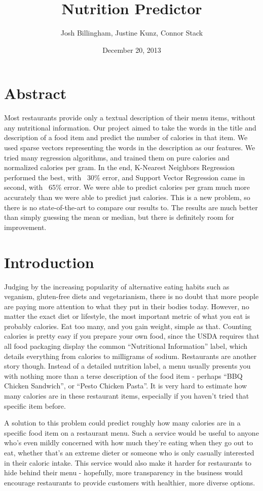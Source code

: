 \documentclass{article}
\title{Nutrition Predictor}
\author{Josh Billingham, Justine Kunz, Connor Stack}
\date{December 20, 2013}
\begin{document}
\maketitle

\section{Abstract}

Most restaurants provide only a textual description of their menu items, without any nutritional information. Our project aimed to take the words in the title and description of a food item and predict the number of calories in that item. We used sparse vectors representing the words in the description as our features. We tried many regression algorithms, and trained them on pure calories and normalized calories per gram. In the end, K-Nearest Neighbors Regression performed the best, with ~30\% error, and Support Vector Regression came in second, with ~65\% error. We were able to predict calories per gram much more accurately than we were able to predict just calories. This is a new problem, so there is no state-of-the-art to compare our results to. The results are much better than simply guessing the mean or median, but there is definitely room for improvement.

\section{Introduction}
Judging by the increasing popularity of alternative eating habits such as veganism, gluten-free diets and vegetarianism, there is no doubt that more people are paying more attention to what they put in their bodies today. However, no matter the exact diet or lifestyle, the most important metric of what you eat is probably calories. Eat too many, and you gain weight, simple as that. Counting calories is pretty easy if you prepare your own food, since the USDA requires that all food packaging display the common “Nutritional Information” label, which details everything from calories to milligrams of sodium. Restaurants are another story though. Instead of a detailed nutrition label, a menu usually presents you with nothing more than a terse description of the food item - perhaps “BBQ Chicken Sandwich”, or “Pesto Chicken Pasta”. It is very hard to estimate how many calories are in these restaurant items, especially if you haven’t tried that specific item before.

A solution to this problem could predict roughly how many calories are in a specific food item on a restaurant menu. Such a service would be useful to anyone who’s even mildly concerned with how much they’re eating when they go out to eat, whether that’s an extreme dieter or someone who is only casually interested in their caloric intake. This service would also make it harder for restaurants to hide behind their menu - hopefully, more transparency in the business would encourage restaurants to provide customers with healthier, more diverse options.
\end{document}
